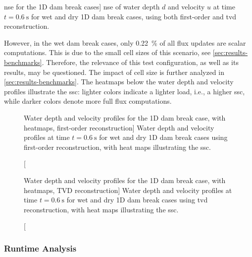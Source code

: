 \begin{table}[!h]
  \caption
  [\acrshort{nse} for the 1D dam break cases]
  {
    \acrshort{nse} of water depth $d$ and velocity $u$ at time $t=\SI{0.6}{\second}$ for wet and dry \acrshort{1D} dam break cases, using both first-order and \acrshort{tvd} reconstruction.
  }
  \label{tab:nse-accuracy}
  \small
  \centering
  
\end{table}

However, in the wet dam break cases, only \SI{0.22}{\percent} of all flux updates are scalar computations.
This is due to the small cell sizes of this scenario, see \autoref{sec:results-benchmarks}.
Therefore, the relevance of this test configuration, as well as its results, may be questioned.
The impact of cell size is further analyzed in \autoref{sec:results-benchmarks}.
The heatmaps below the water depth and velocity profiles illustrate the \gls{ssc}:
lighter colors indicate a lighter load, i.e., a higher \acrlong{ssc}, while darker colors denote more full flux computations.

\begin{figure}[htbp]
  \centering

  

  \caption
  [Water depth and velocity profiles for the 1D dam break case, with heatmaps, first-order reconstruction]
  {
    Water depth and velocity profiles at time $t=\SI{0.6}{\second}$ for wet and dry \acrshort{1D} dam break cases using first-order reconstruction, with heat maps illustrating the \acrshort{ssc}.
  }
  \label{fig:acc-fo}
\end{figure}

\begin{figure}[htbp]
  \centering

  

  \caption
  [Water depth and velocity profiles for the 1D dam break case, with heatmaps, TVD reconstruction]
  {
    Water depth and velocity profiles at time $t=\SI{0.6}{\second}$ for wet and dry \acrshort{1D} dam break cases using \acrshort{tvd} reconstruction, with heat maps illustrating the \acrshort{ssc}.
  }
  \label{fig:acc-tvd}
\end{figure}

\FloatBarrier
\newpage
\FloatBarrier
\subsubsection{Runtime Analysis}\label{sec:results-benchmarks}

